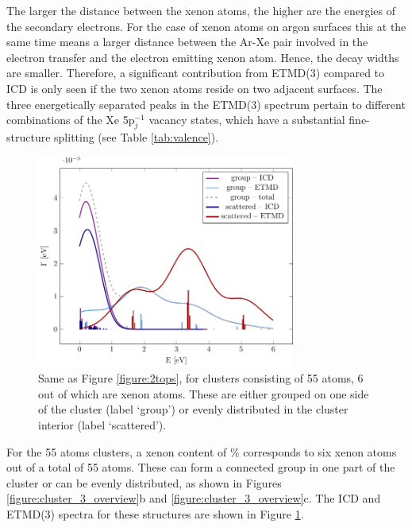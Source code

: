 \documentclass[journal=jpccck,manuscript=article]{achemso}
\begin{document}
The larger the distance between the xenon atoms, the higher are the energies
of the secondary electrons. For the case of xenon atoms on argon surfaces
this at the same time means a larger distance between the Ar-Xe pair involved in
the electron transfer and the electron emitting xenon atom. Hence, the
decay widths are smaller. 
Therefore, a
significant contribution from ETMD(3) compared to ICD is only
seen if the two xenon atoms reside on two adjacent
surfaces. 
The three energetically separated peaks in the ETMD(3) spectrum pertain to different combinations of the Xe 5p$_j^{-1}$ vacancy states, which have a substantial fine-structure splitting (see Table \ref{tab:valence}). 
%

\begin{figure}[ht]
 \centering
 \includegraphics[width=8.5cm]{ar_3_6in.pdf}
 \caption{Same as Figure \protect\ref{figure:2tops}, for clusters consisting of
          55 atoms, 6 out of which are xenon atoms. These are either grouped
          on one side of the cluster (label `group') or evenly distributed
          in the cluster interior (label `scattered').}
 \label{figure:ar_3_6in}
\end{figure}
%
For the 55 atoms clusters, a xenon content of \unit[10--12]{\%}
corresponds to six xenon atoms out of a total of 55 atoms. These can form a connected 
group in one part of the cluster or can be evenly distributed,
as shown in Figures \ref{figure:cluster_3_overview}b and \ref{figure:cluster_3_overview}c. The
ICD and ETMD(3) spectra for these structures are shown in Figure \ref{figure:ar_3_6in}.
\end{document}
